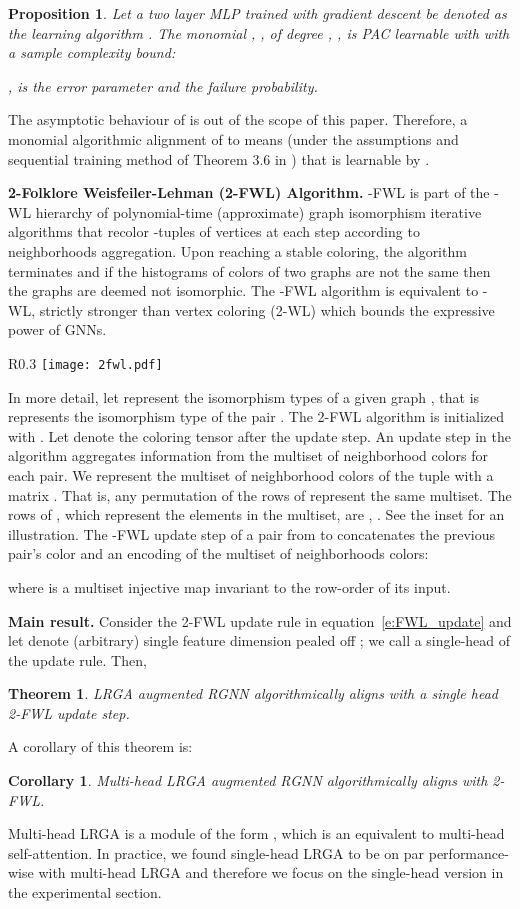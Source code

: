 \documentclass{article} \usepackage{iclr2021_conference,times}
\newtheorem{theorem}{Theorem}
\newtheorem{proposition}{Proposition}
\newtheorem{corollary}{Corollary}
\def\eqref#1{equation~\ref{#1}}
\begin{document}
\begin{proposition}
Let a two layer MLP trained with gradient descent be denoted as the learning algorithm . The monomial , , of degree , , is PAC learnable with  with a sample complexity bound:

,  is the error parameter and  the failure probability.
\end{proposition}
The asymptotic behaviour of  is out of the scope of this paper. 
Therefore, a monomial algorithmic alignment of  to  means (under the assumptions and sequential training method of Theorem 3.6 in \cite{Xu2019algoalign}) that  is learnable by .  

\textbf{2-Folklore Weisfeiler-Lehman (2-FWL) Algorithm.}
-FWL is part of the -WL hierarchy of polynomial-time (approximate) graph isomorphism iterative algorithms that recolor -tuples of vertices at each step according to neighborhoods aggregation. Upon reaching a stable coloring, the algorithm terminates and if the histograms of colors of two graphs are not the same then the graphs are deemed not isomorphic. The -FWL algorithm is equivalent to -WL, strictly stronger than vertex coloring (2-WL) which bounds the expressive power of GNNs. 

\begin{wrapfigure}[7]{R}{0.3\textwidth}
\vspace{-10pt}
\texttt{[image: 2fwl.pdf]}
\vspace{5pt}
\end{wrapfigure}
In more detail, let  represent the isomorphism types of a given graph , that is  represents the isomorphism type of the pair .  The 2-FWL algorithm is initialized with . 
Let  denote the coloring tensor after the  update step. An update step in the algorithm aggregates information from the multiset of neighborhood colors for each pair. We represent the multiset of neighborhood colors of the tuple  with a matrix . That is, any permutation of the rows of  represent the same multiset. The rows of , which represent the elements in the multiset, are , . See the inset for an illustration. 
The -FWL update step of a pair  from  to  concatenates the previous pair's color and an encoding of the multiset of neighborhoods colors:

where  is a multiset injective  map invariant to the row-order of its input.

\textbf{Main result.} Consider the 2-FWL update rule in \eqref{e:FWL_update} and let  denote (arbitrary) single feature dimension pealed off ; we call  a single-head of the update rule. Then,
\begin{theorem} \label{thm:algoalign}
LRGA augmented RGNN algorithmically aligns with a single head 2-FWL update step.
\end{theorem}
A corollary of this theorem is: 
\begin{corollary}
Multi-head LRGA augmented RGNN algorithmically aligns with 2-FWL.
\end{corollary}
Multi-head LRGA is a module of the form , which is an equivalent to multi-head self-attention. In practice, we found single-head LRGA to be on par performance-wise with multi-head LRGA and therefore we focus on the single-head version in the experimental section. 
\end{document}

